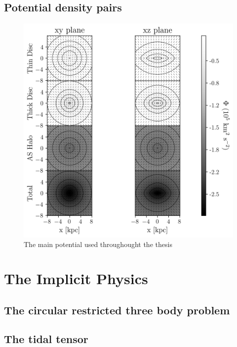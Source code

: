     \subsection{Potential density pairs}

        \begin{figure}
            \centering
            \includegraphics[width=\linewidth]{images/figure_pouliasis2017pii_potential_-8_8.png}
            \caption{The main potential used throughought the thesis}
        \end{figure}        
    

\section{The Implicit Physics}

    \subsection{The circular restricted three body problem}

    \subsection{The tidal tensor}
        

